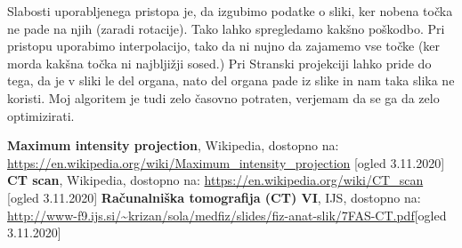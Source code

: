 \documentclass[12pt,a4paper]{article}
\begin{document}
Slabosti uporabljenega pristopa je, da izgubimo podatke o sliki, ker nobena točka ne pade na njih (zaradi rotacije). Tako lahko spregledamo kakšno poškodbo. Pri pristopu uporabimo interpolacijo, tako da ni nujno da zajamemo vse točke (ker morda kakšna točka ni najbljižji sosed.) Pri Stranski projekciji lahko  pride do tega, da je v sliki le del organa, nato del organa pade iz slike in nam taka slika ne koristi. Moj algoritem je tudi zelo časovno potraten, verjemam da se ga da zelo optimizirati. 
\begin{thebibliography}{9}
\textbf{Maximum intensity projection}, Wikipedia, dostopno na: \url{https://en.wikipedia.org/wiki/Maximum_intensity_projection} [ogled 3.11.2020]
\textbf{CT scan}, Wikipedia, dostopno na: \url{https://en.wikipedia.org/wiki/CT_scan} [ogled 3.11.2020]
\textbf{Računalniška tomografija (CT) VI}, IJS, dostopno na: \url{http://www-f9.ijs.si/~krizan/sola/medfiz/slides/fiz-anat-slik/7FAS-CT.pdf}[ogled 3.11.2020]

\end{thebibliography}
\end{document}
